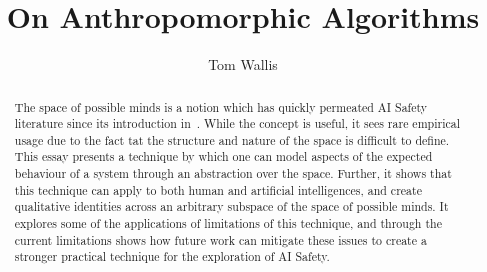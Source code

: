 



\author{Tom Wallis}
\title{On Anthropomorphic Algorithms}  %
\date{}
\maketitle

\begin{abstract} %
    The space of possible minds is a notion which has quickly permeated AI Safety literature since its introduction in~\cite{Sloman1984TheMinds}. While the concept is useful, it sees rare empirical usage due to the fact tat the structure and nature of the space is difficult to define. This essay presents a technique by which one can model aspects of the expected behaviour of a system through an abstraction over the space. Further, it shows that this technique can apply to both human and artificial intelligences, and create qualitative identities across an arbitrary subspace of the space of possible minds. It explores some of the applications of limitations of this technique, and through the current limitations shows how future work can mitigate these issues to create a stronger practical technique for the exploration of AI Safety.
\end{abstract}








\printbibliography{}


